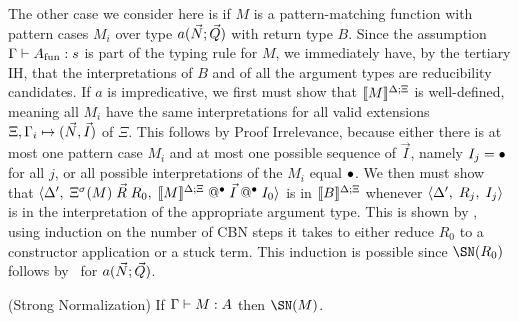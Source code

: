 \documentclass{article}
\begin{document}
\begin{myproof}
The other case we consider here is if $M$ is a pattern-matching
function with pattern cases $M_i$ over type
$\ctorapp{a}{\vec{N}}{\vec{Q}}$ with return type $B$.  Since the
assumption $\typej{\Afun}{s}$ is part of the typing rule for $M$, we
immediately have, by the tertiary IH, that the interpretations of $B$
and of all the argument types are reducibility candidates.  If $a$ is
impredicative, we first must show that $\interp{M}$ is well-defined,
meaning all $M_i$ have the same interpretations for all valid
extensions $\Xi,\dgform[\Gamma_i]{\vec{N}}{\vec{I}}$ of $\Xi$.  This follows
by Proof Irrelevance, because either there is at most one pattern case
$M_i$ and at most one possible sequence of $\vec{I}$, namely
$I_j=\dummy$ for all $j$, or all possible interpretations of the $M_i$
equal $\dummy$. We then must show that
$\triple{\Delta'}{\Dsubst(M)\;\vec{R}\;R_0}{\appstar{\appstar{\interp{M}}{\vec{I}}}{I_0}}$
is in $\interp{B}$ whenever $\triple{\Delta'}{R_j}{I_j}$ is in the
interpretation of the appropriate argument type. This is shown by
\CRthree, using induction on the number of CBN steps it takes to
either reduce $R_0$ to a constructor application or a stuck term.
This induction is possible since $\SN(R_0)$ follows by \CRone\ for
$\ctorapp{a}{\vec{N}}{\vec{Q}}$.
%
\fi
\end{myproof}


\begin{corollary}(Strong Normalization)
If $\typej{M}{A}$ then $\SN(M)$.
\end{corollary}






\end{document}
